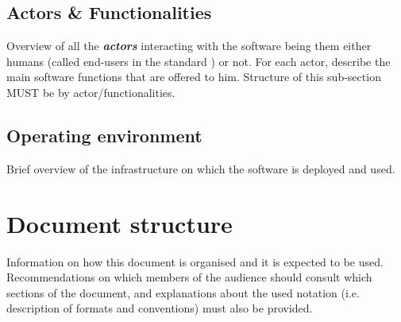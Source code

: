    

\subsection{Actors \& Functionalities}
Overview of all the \textbf{\emph{\glspl{actor}}} interacting with the software
being them either humans (called end-users in the standard
\cite{IEEE-2001-userdocumentation}) or not. For each actor, describe the main
software functions that are offered to him. Structure of this sub-section MUST
be by actor/functionalities.


\subsection{Operating environment}
Brief overview of the infrastructure on which the software is deployed and used.

\section{Document structure}  
Information on how this document is organised and it is expected to be
used. Recommendations on which members of the audience
should consult which sections of the document, and explanations about the used
notation (i.e. description of formats and conventions) must also be provided.





